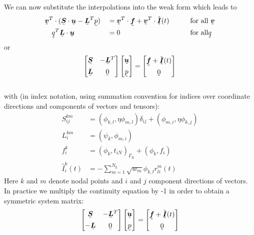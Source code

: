 We can now substitute the interpolations into the weak form which leads to
\begin{alignat*}{3}
   &\col{\vek v}^T\cdot(\mat{\ten S}\cdot\col{\vek u}-\mat{\vek L}^T\col p)&&=
    \col{\vek v}^T\cdot\col{\vek f}
+\col{\vek v}^T\cdot\hat{\col{\vek I}}(t)\qquad&&\text{for all }\col{\vek v}\\
   &\quad\col q^T\mat{\vek L}\cdot\col{\vek u}&&=0\qquad&&\text{for all}\col{q}
\end{alignat*}
or
\[
 \begin{bmatrix}
   \mat{\ten S} &-\mat{\vek L}^T \\[1ex]
  \mat{\vek L} & \mat 0
 \end{bmatrix}
 \begin{bmatrix}
    \col{\vek u}\\[1ex]
    \col p
 \end{bmatrix}=
 \begin{bmatrix}
\col{\vek f} +\hat{\col{\vek I}}(t) \\[1ex]
    \col 0
 \end{bmatrix}
\]\medskip\\
with (in index notation, using summation convention for indices over
coordinate directions and components of vectors and tensors):
\begin{align*}
       S_{ij}^{km}&= (\phi_{k,l},\eta\phi_{m,l})\delta_{ij}+
          (\phi_{m,i},\eta\phi_{k,j})\\
    L_i^{km}&=(\psi_k,\phi_{m,i})\\
     f^k_i&=(\phi_k,t_{iN})_{\Gamma_{\text{N}}}+(\phi_k,f_i)\\
\hat I^k_i(t)&=-\sum_{m=1}^{N_\text{g}}\sqrt{w_m}\phi_{k,l} r^m_{li}(t)
\end{align*}
Here $k$ and $m$ denote nodal points and $i$ and $j$ component directions of
vectors. In practice we multiply the continuity equation by -1 in order to
obtain a symmetric system matrix:
\[
 \begin{bmatrix}
   \mat{\ten S} &-\mat{\vek L}^T \\[1ex]
  -\mat{\vek L} & \mat 0
 \end{bmatrix}
 \begin{bmatrix}
    \col{\vek u}\\[1ex]
    \col p
 \end{bmatrix}=
 \begin{bmatrix}
\col{\vek f} +\hat{\col{\vek I}}(t) \\[1ex]
    \col 0
 \end{bmatrix}
\]

